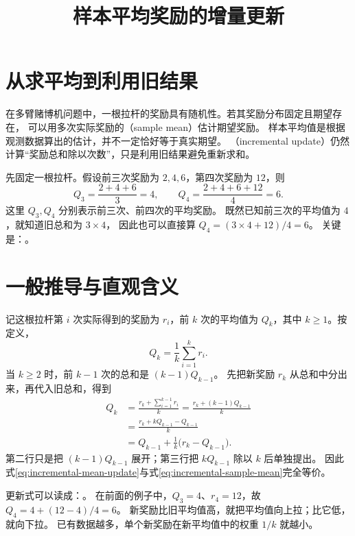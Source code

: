 \documentclass[UTF8]{ctexart}
\title{样本平均奖励的增量更新}
\author{}
\date{}
\begin{document}
\maketitle

\section{从求平均到利用旧结果}
\label{sec:incremental-mean-example}

在多臂赌博机问题中，一根拉杆的奖励具有随机性。若其奖励分布固定且期望存在，
可以用多次实际奖励的（sample mean）估计期望奖励。
样本平均值是根据观测数据算出的估计，并不一定恰好等于真实期望。
（incremental update）仍然计算“奖励总和除以次数”，只是利用旧结果避免重新求和。

先固定一根拉杆。假设前三次奖励为 $2,4,6$，第四次奖励为 $12$，则
\[
  Q_3=\frac{2+4+6}{3}=4,
  \qquad
  Q_4=\frac{2+4+6+12}{4}=6.
\]
这里 $Q_3,Q_4$ 分别表示前三次、前四次的平均奖励。
既然已知前三次的平均值为 $4$，就知道旧总和为 $3\times4$，
因此也可以直接算 $Q_4=(3\times4+12)/4=6$。
关键是：。

\section{一般推导与直观含义}
\label{sec:incremental-mean-derivation}

记这根拉杆第 $i$ 次实际得到的奖励为 $r_i$，前 $k$ 次的平均值为 $Q_k$，其中 $k\geq1$。按定义，
\begin{equation}
  Q_k=\frac{1}{k}\sum_{i=1}^{k}r_i.
  \label{eq:incremental-sample-mean}
\end{equation}
当 $k\geq2$ 时，前 $k-1$ 次的总和是 $(k-1)Q_{k-1}$。
先把新奖励 $r_k$ 从总和中分出来，再代入旧总和，得到
\begin{equation}
  \begin{aligned}
    Q_k
    &=\frac{r_k+\sum_{i=1}^{k-1}r_i}{k}
     =\frac{r_k+(k-1)Q_{k-1}}{k}\\
    &=\frac{r_k+kQ_{k-1}-Q_{k-1}}{k}\\
    &=Q_{k-1}+\frac{1}{k}\bigl(r_k-Q_{k-1}\bigr).
  \end{aligned}
  \label{eq:incremental-mean-update}
\end{equation}
第二行只是把 $(k-1)Q_{k-1}$ 展开；第三行把 $kQ_{k-1}$ 除以 $k$ 后单独提出。
因此式\eqref{eq:incremental-mean-update}与式\eqref{eq:incremental-sample-mean}完全等价。

更新式可以读成：。
在前面的例子中，$Q_3=4$、$r_4=12$，故 $Q_4=4+(12-4)/4=6$。
新奖励比旧平均值高，就把平均值向上拉；比它低，就向下拉。
已有数据越多，单个新奖励在新平均值中的权重 $1/k$ 就越小。
\end{document}
